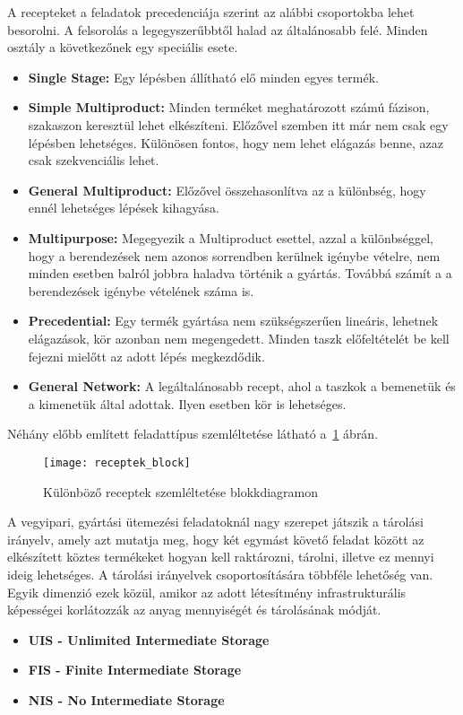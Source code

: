 A recepteket a feladatok precedenciája szerint az alábbi csoportokba lehet besorolni.
A felsorolás a legegyszerűbbtől halad az általánosabb felé.
Minden osztály a következőnek egy speciális esete.
\begin{itemize}
	\item \textbf{Single Stage:} Egy lépésben állítható elő minden egyes termék.
	\item \textbf{Simple Multiproduct:} Minden terméket meghatározott számú fázison, szakaszon keresztül lehet elkészíteni.
	Előzővel szemben itt már nem csak egy lépésben lehetséges.
	Különösen fontos, hogy nem lehet elágazás benne, azaz csak szekvenciális lehet.
	\item \textbf{General Multiproduct:} Előzővel összehasonlítva az a különbség, hogy ennél lehetséges lépések kihagyása.
	\item \textbf{Multipurpose:} Megegyezik a Multiproduct esettel, azzal a különbséggel, hogy a berendezések nem azonos sorrendben kerülnek igénybe vételre, nem minden esetben balról jobbra haladva történik a gyártás.
	Továbbá számít a a berendezések igénybe vételének száma is.
	\item \textbf{Precedential:} Egy termék gyártása nem szükségszerűen lineáris, lehetnek elágazások, kör azonban nem megengedett.
	Minden taszk előfeltételét be kell fejezni mielőtt az adott lépés megkezdődik. 
	\item \textbf{General Network:} A legáltalánosabb recept, ahol a taszkok a bemenetük és a kimenetük által adottak.
	Ilyen esetben kör is lehetséges.
\end{itemize}

Néhány előbb említett feladattípus szemléltetése látható a~\ref{receptek_block} ábrán.
\begin{figure}[H]	
\begin{center}
\texttt{[image: receptek\_block]}
\caption{Különböző receptek szemléltetése blokkdiagramon}
\label{receptek_block}
\end{center}
\end{figure}

\newpage
A vegyipari, gyártási ütemezési feladatoknál nagy szerepet játszik a tárolási irányelv, amely azt mutatja meg, hogy két egymást követő feladat között az elkészített köztes termékeket hogyan kell raktározni, tárolni, illetve ez mennyi ideig lehetséges.
A tárolási irányelvek csoportosítására többféle lehetőség van.
Egyik dimenzió ezek közül, amikor az adott létesítmény infrastrukturális képességei korlátozzák az anyag mennyiségét és tárolásának módját.
\begin{itemize}
	\item \textbf{UIS - Unlimited Intermediate Storage}
	\item \textbf{FIS - Finite Intermediate Storage}
	\item \textbf{NIS - No Intermediate Storage}
\end{itemize}

